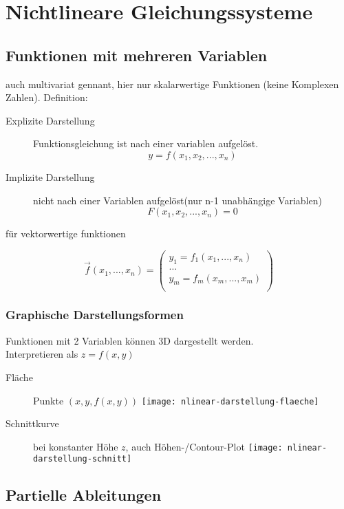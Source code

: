 \section{Nichtlineare Gleichungssysteme}

\subsection{Funktionen mit mehreren Variablen}

auch multivariat gennant, hier nur skalarwertige Funktionen (keine Komplexen Zahlen). Definition:
\begin{description}
	\item[Explizite Darstellung] Funktionsgleichung ist nach einer variablen aufgelöst.
		$$y = f(x_1, x_2, ...,x_n)$$
	\item[Implizite Darstellung] nicht nach einer Variablen aufgelöst(nur n-1
		unabhängige Variablen)
		$$F(x_1, x_2, ..., x_n) = 0$$
\end{description}

für vektorwertige funktionen

$$\vec{f}(x_1, ..., x_n) =
	\begin{pmatrix}
		y_1 = f_1(x_1, ..., x_n) \\
		\hdots                   \\
		y_m = f_m(x_m, ..., x_m) \\
	\end{pmatrix}
$$


\subsubsection{Graphische Darstellungsformen}
Funktionen mit 2 Variablen können 3D dargestellt werden. \\
Interpretieren als $z = f(x, y)$

\begin{multicols}{2}
	\begin{description}
		\item[Fläche] Punkte $(x, y, f(x,y))$
			\texttt{[image: nlinear-darstellung-flaeche]}
		\item[Schnittkurve] bei konstanter Höhe $z$, auch Höhen-/Contour-Plot
			\texttt{[image: nlinear-darstellung-schnitt]}
	\end{description}
\end{multicols}



\subsection{Partielle Ableitungen}


